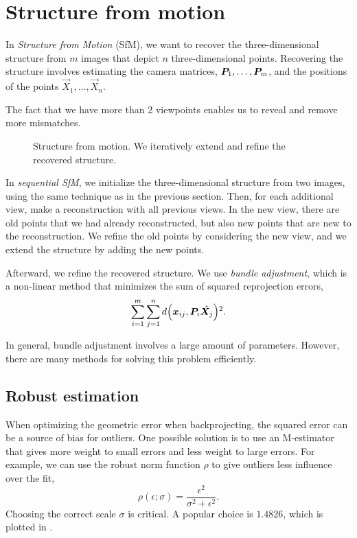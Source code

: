 \section{Structure from motion} \label{sec:sfm}

In \textit{Structure from Motion} (SfM), we want to recover the
three-dimensional structure from $m$ images that depict $n$ three-dimensional
points. Recovering the structure involves estimating the camera matrices,
$\bm{P}_1, \ldots, \bm{P}_m$, and the positions of the points $\vec{X}_1,
\ldots, \vec{X}_n$.

The fact that we have more than 2 viewpoints enables us to reveal and remove
more mismatches.

\begin{figure}[t]
    \centering
    \caption{Structure from motion. We iteratively extend and refine the
    recovered structure.}
    \label{fig:structure-from-motion}
\end{figure}

In \textit{sequential SfM}, we initialize the three-dimensional structure from
two images, using the same technique as in the previous section. Then, for each
additional view, make a reconstruction with all previous views. In the new
view, there are old points that we had already reconstructed, but also new
points that are new to the reconstruction. We refine the old points by
considering the new view, and we extend the structure by adding the new points.

Afterward, we refine the recovered structure. We use \textit{bundle
adjustment}, which is a non-linear method that minimizes the sum of squared
reprojection errors, \[
  \sum_{i=1}^m \sum_{j=1}^n d \lft( \vec{x}_{ij}, \mat{P}_i \hat{\mat{X}_j} \rgt)^2
.\]

In general, bundle adjustment involves a large amount of parameters. However,
there are many methods for solving this problem efficiently.

\subsection{Robust estimation}

When optimizing the geometric error when backprojecting, the squared error can
be a source of bias for outliers. One possible solution is to use an
M-estimator that gives more weight to small errors and less weight to large
errors. For example, we can use the robust norm function $\rho$ to give
outliers less influence over the fit, \[
  \rho(\epsilon; \sigma) = \frac{\epsilon^2}{\sigma^2 + \epsilon^2}
.\]
Choosing the correct scale $\sigma$ is critical. A popular choice is $1.4826$,
which is plotted in .

